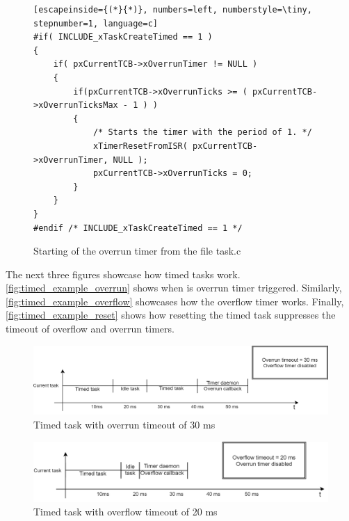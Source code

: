 \begin{figure}[H]
\begin{changemargin}{1cm}{1cm}
\begin{lstlisting}[escapeinside={(*}{*)}, numbers=left, numberstyle=\tiny, stepnumber=1, language=c]
#if( INCLUDE_xTaskCreateTimed == 1 )
{
    if( pxCurrentTCB->xOverrunTimer != NULL )
    {
        if(pxCurrentTCB->xOverrunTicks >= ( pxCurrentTCB->xOverrunTicksMax - 1 ) )
        {
            /* Starts the timer with the period of 1. */
            xTimerResetFromISR( pxCurrentTCB->xOverrunTimer, NULL );
            pxCurrentTCB->xOverrunTicks = 0;
        }
    }
}
#endif /* INCLUDE_xTaskCreateTimed == 1 */
\end{lstlisting}  
\end{changemargin}
\caption{Starting of the overrun timer from the file task.c}
\label{fig:freertos_overrun_start}
    
\end{figure}


 The next three figures showcase how timed tasks work. \autoref{fig:timed_example_overrun} shows when is overrun timer triggered. Similarly, \autoref{fig:timed_example_overflow} showcases how the overflow timer works. Finally, \autoref{fig:timed_example_reset} shows how resetting the timed task suppresses the timeout of overflow and overrun timers.

\begin{figure}[H]

      \centering
      \includegraphics[width=\linewidth]{images/timed_example_overrun.png}
      \caption{Timed task with overrun timeout of 30 ms}
      \label{fig:timed_example_overrun}
    
\end{figure}

\begin{figure}[H]

      \centering
      \includegraphics[width=\linewidth]{images/timed_example_overflow.png}
      \caption{Timed task with overflow timeout of 20 ms}
      \label{fig:timed_example_overflow}
    
\end{figure}

